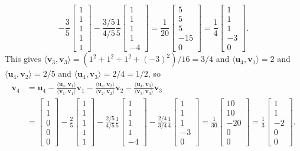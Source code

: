 \documentclass{amsart}
\newcommand{\bsm}       {\left[\begin{smallmatrix}}
\newcommand{\esm}       {\end{smallmatrix}\right]}
\newcommand{\ip}[1]     {\langle #1\rangle}
\newcommand{\vu}        {\mathbf{u}}
\newcommand{\vv}        {\mathbf{v}}
\renewcommand{\:}       {\colon}
\theoremstyle{definition}
\renewenvironment{solution}{\SolutionAtEnd}{\endSolutionAtEnd}
\begin{document}
\begin{solution}
\[      - \frac{3}{5} \bsm 1\\1\\1\\1\\1 \esm
      - \frac{3/5}{4/5} \frac{1}{5} \bsm 1\\1\\1\\1\\-4 \esm
    = \frac{1}{20} \bsm 5\\ 5\\ 5\\ -15\\ 0\esm 
    = \frac{1}{4} \bsm 1\\ 1\\ 1\\ -3\\ 0\esm .
 \]
 This gives $\ip{\vv_3,\vv_3}=(1^2+1^2+1^2+(-3)^2)/16=3/4$ and 
 $\ip{\vu_4,\vv_1}=2$ and $\ip{\vu_4,\vv_2}=2/5$ and
 $\ip{\vu_4,\vv_3}=2/4=1/2$, so 
 \begin{align*}
  \vv_4 &=  \vu_4 - \frac{\ip{\vu_4,\vv_1}}{\ip{\vv_1,\vv_1}}\vv_1
              - \frac{\ip{\vu_4,\vv_2}}{\ip{\vv_2,\vv_2}}\vv_2
              - \frac{\ip{\vu_4,\vv_3}}{\ip{\vv_3,\vv_3}}\vv_3 \\
   &= \bsm 1\\ 1\\ 0\\ 0\\ 0\esm 
      - \frac{2}{5} \bsm 1\\1\\1\\1\\1 \esm
      - \frac{2/5}{4/5} \frac{1}{5} \bsm 1\\1\\1\\1\\-4 \esm
      - \frac{2/4}{3/4} \frac{1}{4} \bsm 1\\1\\1\\-3\\0 \esm
    = \frac{1}{30} \bsm 10\\ 10\\ -20\\ 0\\ 0\esm 
    = \frac{1}{3} \bsm 1\\ 1\\ -2\\ 0\\ 0\esm .
 \end{align*}

\end{solution}
\end{document}
